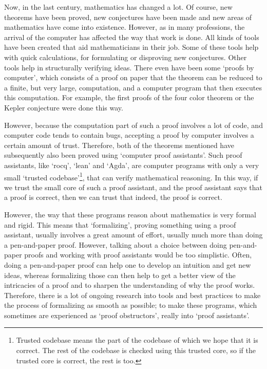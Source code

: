 Now, in the last century, mathematics has changed a lot. Of course, new theorems have been proved, new conjectures have been made and new areas of mathematics have come into existence. However, as in many professions, the arrival of the computer has affected the way that work is done. All kinds of tools have been created that aid mathematicians in their job. Some of these tools help with quick calculations, for formulating or disproving new conjectures. Other tools help in structurally verifying ideas. There even have been some `proofs by computer', which consists of a proof on paper that the theorem can be reduced to a finite, but very large, computation, and a computer program that then executes this computation. For example, the first proofs of the four color theorem \autocite{four-color-theorem} or the Kepler conjecture \autocite{Kepler-conjecture} were done this way.

However, because the computation part of such a proof involves a lot of code, and computer code tends to contain bugs, accepting a proof by computer involves a certain amount of trust. Therefore, both of the theorems mentioned have subsequently also been proved using `computer proof assistants'\autocite{formalized-four-color-theorem}\autocite{formalized-Kepler-conjecture}. Such proof assistants, like `rocq', `lean' and `Agda', are computer programs with only a very small `trusted codebase'\footnote{Trusted codebase means the part of the codebase of which we hope that it is correct. The rest of the codebase is checked using this trusted core, so if the trusted core is correct, the rest is too.}, that can verify mathematical reasoning. In this way, if we trust the small core of such a proof assistant, and the proof assistant says that a proof is correct, then we can trust that indeed, the proof is correct.

However, the way that these programs reason about mathematics is very formal and rigid. This means that `formalizing', proving something using a proof assistant, usually involves a great amount of effort, usually much more than doing a pen-and-paper proof. However, talking about a choice between doing pen-and-paper proofs and working with proof assistants would be too simplistic. Often, doing a pen-and-paper proof can help one to develop an intuition and get new ideas, whereas formalizing those can then help to get a better view of the intricacies of a proof and to sharpen the understanding of why the proof works. Therefore, there is a lot of ongoing research into tools and best practices to make the process of formalizing as smooth as possible; to make these programs, which sometimes are experienced as `proof obstructors', really into `proof assistants'.

